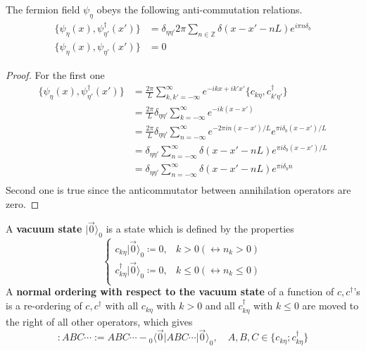 \begin{prop}
The fermion field $\psi_\eta$ obeys the following anti-commutation relations.
\begin{align}
\{\psi_{\eta}(x),\psi_{\eta'}^\dagger(x')\}&=\delta_{\eta\eta'}2\pi\sum_{n\in \mathbb{Z}}\delta(x-x'-nL)e^{i\pi n\delta_b}\\
\{\psi_{\eta}(x),\psi_{\eta'}(x')\}&=0
\end{align}
\end{prop}
\begin{proof}
For the first one
\begin{align*}
\{\psi_{\eta}(x),\psi_{\eta'}^\dagger(x')\}&=\frac{2\pi}{L}\sum_{k,k'=-\infty}^{\infty} e^{-ikx+ik'x'}\{c_{k\eta},c_{k'\eta'}^\dagger\}\\
&=\frac{2\pi}{L}\delta_{\eta\eta'}\sum_{k=-\infty}^{\infty} e^{-ik(x-x')}\\
&=\frac{2\pi}{L}\delta_{\eta\eta'}\sum_{n=-\infty}^{\infty} e^{-2\pi i n(x-x')/L}e^{\pi i\delta_b(x-x')/L}\\
&=\delta_{\eta\eta'}\sum_{n=-\infty}^{\infty} \delta(x-x'-nL)e^{\pi i\delta_b(x-x')/L}\\
&=\delta_{\eta\eta'}\sum_{n=-\infty}^{\infty} \delta(x-x'-nL)e^{\pi i\delta_bn}\\
\end{align*}
Second one is true since the anticommutator between annihilation operators are zero.
\end{proof}

\begin{defn} A \textbf{vacuum state} $|\vec{0}\rangle_0$ is a state which is defined by the properties
\begin{equation}
\begin{cases}
c_{k\eta}|\vec{0}\rangle_0\coloneqq 0,& k>0(\leftrightarrow n_k>0)\\
c_{k\eta}^\dagger|\vec{0}\rangle_0\coloneqq 0,& k\leq 0(\leftrightarrow n_k\leq 0)\\
\end{cases}
\end{equation}
A \textbf{normal ordering with respect to the vacuum state} of a function of $c,c^\dagger$'s is a re-ordering of $c,c^\dagger$ with all $c_{k\eta}$ with $k>0$ and all $c^\dagger_{k\eta}$ with $k\leq 0$ are moved to the right of all other operators, which gives
\begin{equation}
:ABC\cdots:=ABC\cdots-{}_0\langle \vec{0}|ABC\cdots|\vec{0}\rangle_0,\quad A,B,C\in \{c_{k\eta};c_{k\eta}^\dagger\}
\end{equation}
\end{defn}

